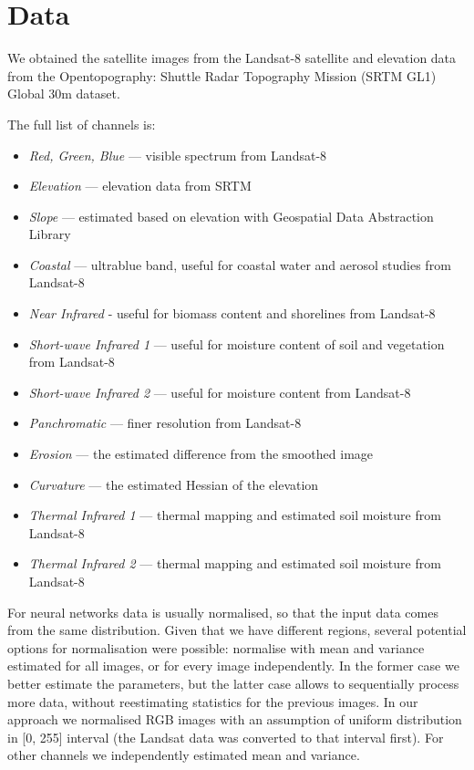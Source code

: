 \documentclass[11pt,a4paper]{article}
\begin{document}
\section{Data}
We obtained the satellite images from the Landsat-8 satellite and elevation data from the Opentopography: Shuttle Radar
Topography Mission (SRTM GL1) Global 30m dataset.

The full list of channels is:
\begin{itemize}
\item \textit{Red, Green, Blue} --- visible spectrum from Landsat-8
\item \textit{Elevation} --- elevation data from SRTM
\item \textit{Slope} --- estimated based on elevation with Geospatial Data Abstraction Library
\item \textit{Coastal} --- ultrablue band, useful for coastal water and aerosol studies from Landsat-8
\item \textit{Near Infrared} - useful for biomass content and shorelines from Landsat-8
\item \textit{Short-wave Infrared 1} --- useful for moisture content of soil and vegetation from Landsat-8
\item \textit{Short-wave Infrared 2} --- useful for moisture content from Landsat-8
\item \textit{Panchromatic} --- finer resolution from Landsat-8
\item \textit{Erosion} --- the estimated difference from the smoothed image
\item \textit{Curvature} --- the estimated Hessian of the elevation
\item \textit{Thermal Infrared 1} --- thermal mapping and estimated soil moisture from Landsat-8
\item \textit{Thermal Infrared 2} --- thermal mapping and estimated soil moisture from Landsat-8
\end{itemize}

For neural networks data is usually normalised, so that the input data comes from the same distribution. Given that we
have different regions, several potential options for normalisation were possible: normalise with mean and variance
estimated for all images, or for every image independently. In the former case we better estimate the parameters, but
the latter case allows to sequentially process more data, without reestimating statistics for the previous images. In
our approach we normalised RGB images with an assumption of uniform distribution in [0, 255] interval
(the Landsat data was converted to that interval first). For other channels we independently estimated mean and variance.
\end{document}
